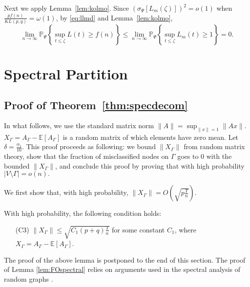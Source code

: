 Next we apply Lemma~\ref{lem:kolmo}. Since $(\sigma_{\Psi}[L_m (\zeta) ])^2 = o(1)$ when $\frac{ pf(n)}{KL(p,q) }  =
\omega( 1 )$, by \eqref{eq:llmd} and Lemma~\ref{lem:kolmo},
$$\lim_{n \to \infty}\mathbb{P}_{\Psi} \left\{ \sup_{t \le
   \zeta} L(t)  \ge f(n) \right\} \le \lim_{n \to \infty}\mathbb{P}_{\Psi} \left\{ \sup_{t \le  \zeta} L_m (t)  \ge 1 \right\} =0 .$$



\section{Spectral Partition}
\subsection{Proof of Theorem~\ref{thm:specdecom}}
In what follows, we use the standard matrix norm $\| A\|=\sup_{\|
  x\|=1}\| Ax\|$. $X_{\Gamma} = A_{\Gamma} - \mathbb{E}[A_{\Gamma}]$ is a random matrix
of which elements have zero mean. Let $\delta = \frac{\alpha_1}{10}$. This proof proceeds as following:
we 
bound $\| X_{\Gamma} \|$ from random matrix theory,  show that
 the fraction of misclassified nodes on $\Gamma$ goes to 0 with
the bounded $\| X_{\Gamma} \|$, and conclude this proof by proving that with high probability
$|V\setminus \Gamma| = o(n).$ 

We first show that, with high probability,  $\| X_{\Gamma} \| =
O(\sqrt{p\frac{T}{n}})$.  
\begin{lemma}
With high probability, the following condition holds:
\begin{itemize}
\item[(C3)] $\| X_{\Gamma} \| \le \sqrt{C_1 (p+q)\frac{T}{n}}$ for
  some constant $C_1$, where
  $X_{\Gamma}=A_{\Gamma}-\mathbb{E}[A_{\Gamma}]$.
\end{itemize}
\label{lem:FOspectral}
\end{lemma}
The proof of the above lemma is postponed to the end of this section. The proof of Lemma \ref{lem:FOspectral} relies on arguments used in the spectral analysis of random graphs \cite{feige2005spectral}.

